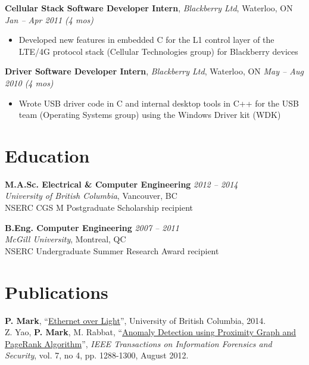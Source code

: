 \documentclass[letterpaper]{article}
\newcommand{\jobtitle}[4]{
  \textbf{#1}, \emph{#2}, {#3} \hfill \emph{#4}\\
}
\newenvironment{jobdescription}{
  \vspace{-4pt}
  \begin{itemize}
  \setlength{\itemsep}{2pt}
  \setlength{\parskip}{0pt}
  \setlength{\parsep}{0pt}
}{\end{itemize}}
\begin{document}
\jobtitle{Cellular Stack Software Developer Intern}{Blackberry
Ltd}{Waterloo, ON}{Jan -- Apr 2011 (4 mos)}
\begin{jobdescription}
  \item Developed new features in embedded C for the L1 control layer of the
  LTE/4G protocol stack (Cellular Technologies group) for Blackberry devices
\end{jobdescription}

\jobtitle{Driver Software Developer Intern}{Blackberry
Ltd}{Waterloo, ON}{May -- Aug 2010 (4 mos)} 
\begin{jobdescription}
  \item Wrote USB driver code in C and internal desktop tools in C++ for the USB
  team (Operating Systems group) using the Windows Driver kit (WDK)
\end{jobdescription}
\bigskip

\section*{Education}
\textbf{M.A.Sc. Electrical \& Computer Engineering}
\hfill \emph{2012 -- 2014}{} \\
\emph{University of British Columbia}, Vancouver, BC \\
NSERC CGS M Postgraduate Scholarship recipient
\medskip 

\textbf{B.Eng. Computer Engineering} \hfill \emph{2007 -- 2011} \\
\emph{McGill University}, Montreal, QC \\
NSERC Undergraduate Summer Research Award recipient
\bigskip

\hypertarget{sec:publications}{}
\section*{Publications}
\textbf{P. Mark}, ``\href{http://circle.ubc.ca/handle/2429/51772}{Ethernet over
  Light}'', University of British Columbia, 2014. \\
\medskip
Z. Yao, \textbf{P. Mark}, M. Rabbat, 
``\href{http://ieeexplore.ieee.org/xpl/articleDetails.jsp?arnumber=6175122}
{Anomaly Detection using Proximity Graph and PageRank Algorithm}'', \emph{IEEE 
Transactions on Information Forensics and Security}, vol. 7, no 4, pp. 
1288-1300, August 2012.
\bigskip
\end{document}
